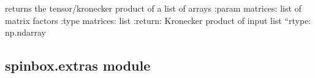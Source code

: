 \documentclass[letterpaper,10pt,english]{sphinxmanual}
\begin{document}

\begin{fulllineitems}
\label{\detokenize{spinbox:spinbox.core.repeated_kronecker_product}}
\pysigstartsignatures
{}
\pysigstopsignatures
\sphinxAtStartPar
returns the tensor/kronecker product of a list of arrays
:param matrices: list of matrix factors
:type matrices: list
:return: Kronecker product of input list
“rtype: np.ndarray

\end{fulllineitems}



\subsection{spinbox.extras module}
\label{\detokenize{spinbox:module-spinbox.extras}}\label{\detokenize{spinbox:spinbox-extras-module}}
\end{document}
